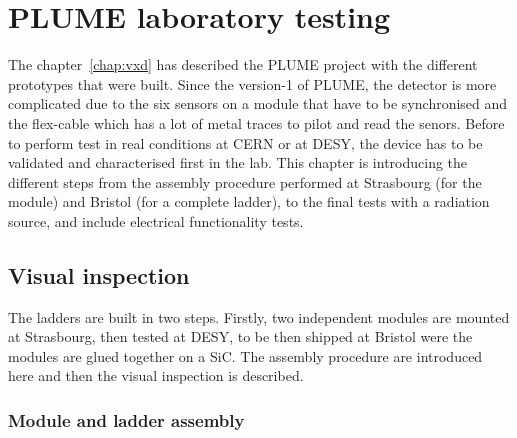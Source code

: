 \chapter{PLUME laboratory testing}
\label{chap:labTests}

  The chapter~\ref{chap:vxd} has described the \gls{PLUME} project with the different prototypes that were built. 
  Since the version-1 of \gls{PLUME}, the detector is more complicated due to the six sensors on a module that have to be synchronised and the flex-cable which has a lot of metal traces to pilot and read the senors.
  Before to perform test in real conditions at CERN or at DESY, the device has to be validated and characterised first in the lab.
  This chapter is introducing the different steps from the assembly procedure performed at Strasbourg (for the module) and Bristol (for a complete ladder), to the final tests with a radiation source, and include electrical functionality tests.

 
 \minitoc
  

\section{Visual inspection}

  The ladders are built in two steps. 
  Firstly, two independent modules are mounted at Strasbourg, then tested at DESY, to be then shipped at Bristol were the modules are glued together on a \gls{SiC}.
  The assembly procedure are introduced here and then the visual inspection is described.

  \subsection{Module and ladder assembly}

